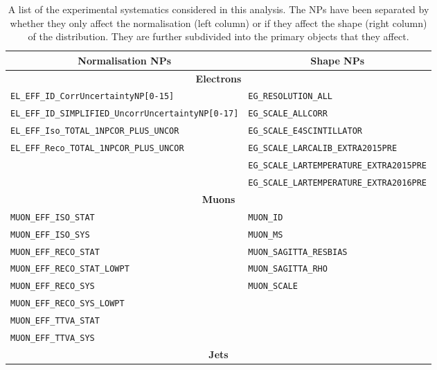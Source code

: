\iffalse
\begin{table}
  \centering
  \caption{
  A list of the experimental systematics considered in this analysis. The NPs have been separated by whether they only
  affect the normalisation (left column) or if they affect the shape (right column) of the \mfl distribution. They are
  further subdivided into the primary objects that they affect.
  }
  \begin{spacing}{0.65}
  \small
  \begin{tabular}{l|l}
    \toprule
    \multicolumn{1}{c}{Normalisation NPs} & \multicolumn{1}{c}{Shape NPs} \\
    \midrule
    \multicolumn{2}{c}{\textbf{Electrons}} \\
    \midrule
    \texttt{EL\_EFF\_ID\_CorrUncertaintyNP[0-15]}               & \texttt{EG\_RESOLUTION\_ALL} \\
    \texttt{EL\_EFF\_ID\_SIMPLIFIED\_UncorrUncertaintyNP[0-17]} & \texttt{EG\_SCALE\_ALLCORR} \\
    \texttt{EL\_EFF\_Iso\_TOTAL\_1NPCOR\_PLUS\_UNCOR}           & \texttt{EG\_SCALE\_E4SCINTILLATOR} \\
    \texttt{EL\_EFF\_Reco\_TOTAL\_1NPCOR\_PLUS\_UNCOR}          & \texttt{EG\_SCALE\_LARCALIB\_EXTRA2015PRE} \\
    ~                                                           & \texttt{EG\_SCALE\_LARTEMPERATURE\_EXTRA2015PRE} \\
    ~                                                           & \texttt{EG\_SCALE\_LARTEMPERATURE\_EXTRA2016PRE} \\
    \midrule
    \multicolumn{2}{c}{\textbf{Muons}} \\
    \midrule
    \texttt{MUON\_EFF\_ISO\_STAT}         & \texttt{MUON\_ID} \\
    \texttt{MUON\_EFF\_ISO\_SYS}          & \texttt{MUON\_MS} \\
    \texttt{MUON\_EFF\_RECO\_STAT}        & \texttt{MUON\_SAGITTA\_RESBIAS} \\
    \texttt{MUON\_EFF\_RECO\_STAT\_LOWPT} & \texttt{MUON\_SAGITTA\_RHO} \\
    \texttt{MUON\_EFF\_RECO\_SYS}         & \texttt{MUON\_SCALE} \\
    \texttt{MUON\_EFF\_RECO\_SYS\_LOWPT}  & ~ \\
    \texttt{MUON\_EFF\_TTVA\_STAT}        & ~ \\
    \texttt{MUON\_EFF\_TTVA\_SYS}         & ~ \\
    \midrule
    \multicolumn{2}{c}{\textbf{Jets}} \\

\end{tabular}
\end{spacing}
\end{table}
